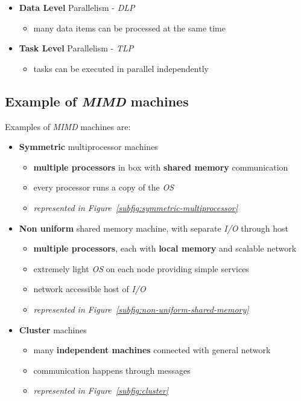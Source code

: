 \documentclass[english]{article}
\begin{document}
\begin{itemize}
  \item \textbf{Data Level} Parallelism - \textit{DLP}
        \begin{itemize}
          \item many data items can be processed at the same time
        \end{itemize}
  \item \textbf{Task Level} Parallelism - \textit{TLP}
        \begin{itemize}
          \item tasks can be executed in parallel independently
        \end{itemize}
\end{itemize}

\subsection{Example of \textit{MIMD} machines}

\bigskip
Examples of \textit{MIMD} machines are:

\begin{itemize}
  \item \textbf{Symmetric} multiprocessor machines
        \begin{itemize}
          \item \textbf{multiple processors} in box with \textbf{shared memory} communication
          \item every processor runs a copy of the \textit{OS}
          \item \textit{represented in Figure~\ref{subfig:symmetric-multiprocessor}}
        \end{itemize}
  \item \textbf{Non uniform} shared memory machine, with separate \textit{I/O} through host
        \begin{itemize}
          \item \textbf{multiple processors}, each with \textbf{local memory} and scalable network
          \item extremely light \textit{OS} on each node providing simple services
          \item network accessible host of \textit{I/O}
          \item \textit{represented in Figure~\ref{subfig:non-uniform-shared-memory}}
        \end{itemize}
  \item \textbf{Cluster} machines
        \begin{itemize}
          \item many \textbf{independent machines} connected with general network
          \item communication happens through messages
          \item \textit{represented in Figure~\ref{subfig:cluster}}
        \end{itemize}
\end{itemize}
\end{document}
